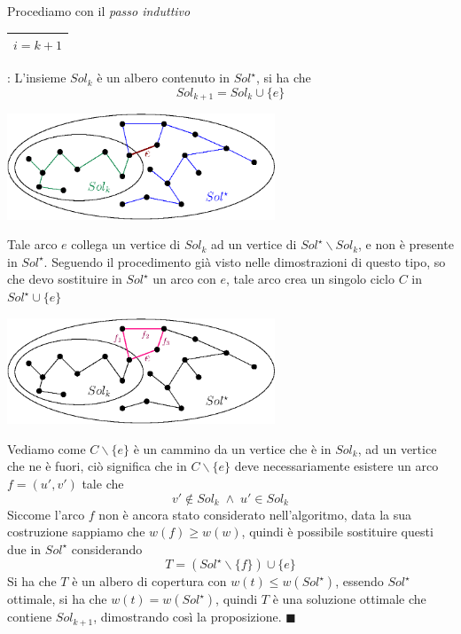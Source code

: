 \documentclass[12pt, letterpaper]{article}
\newcommand{\boxedMath}[1]{\begin{tabular}{|c|}\hline \texttt{#1} \\ \hline\end{tabular} :}
\begin{document}
Procediamo con il \textit{passo induttivo} \boxedMath{$i=k+1$} L'insieme $Sol_k$ è un albero contenuto in $Sol^\star$, si 
ha che $$ Sol_{k+1}=Sol_k\cup\{e\}$$ 
\begin{center}
    \includegraphics[width=0.6\textwidth ]{images/dimPrim1.eps}
\end{center}
Tale arco $e$ collega un vertice di $Sol_k$ ad un vertice di $Sol^\star\backslash Sol_k$, e non è presente in $Sol^\star$. 
Seguendo il procedimento già visto nelle dimostrazioni di questo tipo, so che devo sostituire in $Sol^\star$ un arco 
con $e$, tale arco crea un singolo ciclo $C$ in $Sol^\star \cup \{e\}$
\begin{center}
    \includegraphics[width=0.6\textwidth ]{images/dimPrim2.eps}
\end{center}
Vediamo come $C\backslash\{e\}$ è un cammino da un vertice che è in $Sol_k$, ad un vertice che ne è fuori, ciò significa 
che in $C\backslash\{e\}$ deve necessariamente esistere un arco $f=(u',v')$ tale che $$v'\notin Sol_k\;\land\;u'\in Sol_k$$ 
Siccome l'arco $f$ non è ancora stato considerato nell'algoritmo, data la sua costruzione sappiamo che $w(f)\ge w(w)$, quindi 
è possibile sostituire questi due in $Sol^\star$ considerando 
$$ T=(Sol^\star\backslash\{f\})\cup\{e\}$$ 
Si ha che $T$ è un albero di copertura con $w(t)\le w(Sol^\star)$, essendo $Sol^\star$ ottimale, si ha che 
$w(t) = w(Sol^\star)$, quindi $T$ è una soluzione ottimale che contiene $Sol_{k+1}$, dimostrando così la proposizione. $\blacksquare$
\newpage 
\end{document}
